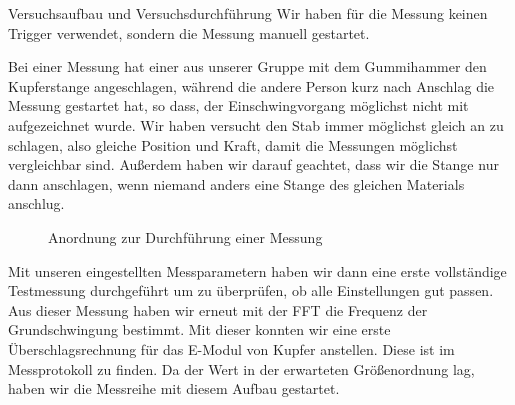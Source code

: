 \documentclass[twoside]{protokoll}
\begin{document}
\begin{aufgabe}{Versuchsaufbau und Versuchsdurchführung}
Wir haben für die Messung keinen Trigger verwendet, sondern die Messung manuell gestartet. 


Bei einer Messung hat einer aus unserer Gruppe mit dem Gummihammer den Kupferstange angeschlagen, während die andere Person kurz nach Anschlag die Messung gestartet hat, so dass, der Einschwingvorgang möglichst nicht mit aufgezeichnet wurde. Wir haben versucht den Stab immer möglichst gleich an zu schlagen, also gleiche Position und Kraft, damit die Messungen möglichst vergleichbar sind. Außerdem haben wir darauf geachtet, dass wir die Stange nur dann anschlagen, wenn niemand anders eine Stange des gleichen Materials anschlug.

\begin{figure}[H]
  \centering
  \hfill
  \caption{Anordnung zur Durchführung einer Messung}
\end{figure}



Mit unseren eingestellten Messparametern haben wir dann eine erste vollständige Testmessung durchgeführt um zu überprüfen, ob alle Einstellungen gut passen. Aus dieser Messung haben wir erneut mit der FFT die Frequenz der Grundschwingung bestimmt. Mit dieser konnten wir eine erste Überschlagsrechnung für das E-Modul von Kupfer anstellen.
Diese ist im Messprotokoll zu finden. Da der Wert in der erwarteten Größenordnung lag, haben wir die Messreihe mit diesem Aufbau gestartet. 



\end{aufgabe}
\end{document}

